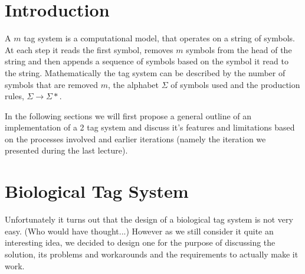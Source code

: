 \documentclass[
11pt, %
a4paper, %
oneside, %
headinclude,footinclude, %
BCOR5mm, %
]{scrartcl}
\begin{document}




\newpage %


\section{Introduction}

A $m$ tag system is a computational model, that operates on a string of symbols.
At each step it reads the first symbol, removes $m$ symbols from the head of the
string and then appends a sequence of symbols based on the symbol it read to the
string. Mathematically the tag system can be described by the number of symbols
that are removed $m$, the alphabet $\Sigma$ of symbols used and the production
rules, $\Sigma \to \Sigma*$.


In the following sections we will first propose a general outline of an
implementation of a 2 tag system and discuss it's features and limitations based
on the processes involved and earlier iterations (namely the iteration we
presented during the last lecture).

\section{Biological Tag System}

\begin{note}
  Unfortunately it turns out that the design of a biological tag system is not
  very easy. (Who would have thought...) However as we still consider it quite
  an interesting idea, we decided to design one for the purpose of discussing
  the solution, its problems and workarounds and the requirements to actually
  make it work.
\end{note}
\end{document}
